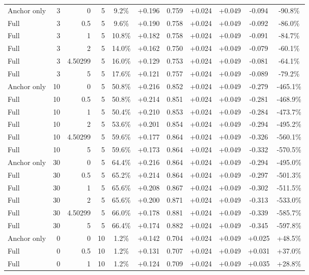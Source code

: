 \begin{table}[htbp]
\begin{tabular}{lrrrccccccc}
Anchor only & 3 & 0 & 5 & 9.2\% & +0.196 & 0.759 & +0.024 & +0.049 & -0.094 & -90.8\% \\
Full & 3 & 0.5 & 5 & 9.6\% & +0.190 & 0.758 & +0.024 & +0.049 & -0.092 & -86.0\% \\
Full & 3 & 1 & 5 & 10.8\% & +0.182 & 0.758 & +0.024 & +0.049 & -0.091 & -84.7\% \\
Full & 3 & 2 & 5 & 14.0\% & +0.162 & 0.750 & +0.024 & +0.049 & -0.079 & -60.1\% \\
Full & 3 & 4.50299 & 5 & 16.0\% & +0.129 & 0.753 & +0.024 & +0.049 & -0.081 & -64.1\% \\
Full & 3 & 5 & 5 & 17.6\% & +0.121 & 0.757 & +0.024 & +0.049 & -0.089 & -79.2\% \\
Anchor only & 10 & 0 & 5 & 50.8\% & +0.216 & 0.852 & +0.024 & +0.049 & -0.279 & -465.1\% \\
Full & 10 & 0.5 & 5 & 50.8\% & +0.214 & 0.851 & +0.024 & +0.049 & -0.281 & -468.9\% \\
Full & 10 & 1 & 5 & 50.4\% & +0.210 & 0.853 & +0.024 & +0.049 & -0.284 & -473.7\% \\
Full & 10 & 2 & 5 & 53.6\% & +0.201 & 0.854 & +0.024 & +0.049 & -0.294 & -495.2\% \\
Full & 10 & 4.50299 & 5 & 59.6\% & +0.177 & 0.864 & +0.024 & +0.049 & -0.326 & -560.1\% \\
Full & 10 & 5 & 5 & 59.6\% & +0.173 & 0.864 & +0.024 & +0.049 & -0.332 & -570.5\% \\
Anchor only & 30 & 0 & 5 & 64.4\% & +0.216 & 0.864 & +0.024 & +0.049 & -0.294 & -495.0\% \\
Full & 30 & 0.5 & 5 & 65.2\% & +0.214 & 0.864 & +0.024 & +0.049 & -0.297 & -501.3\% \\
Full & 30 & 1 & 5 & 65.6\% & +0.208 & 0.867 & +0.024 & +0.049 & -0.302 & -511.5\% \\
Full & 30 & 2 & 5 & 65.6\% & +0.200 & 0.871 & +0.024 & +0.049 & -0.313 & -533.0\% \\
Full & 30 & 4.50299 & 5 & 66.0\% & +0.178 & 0.881 & +0.024 & +0.049 & -0.339 & -585.7\% \\
Full & 30 & 5 & 5 & 66.4\% & +0.174 & 0.882 & +0.024 & +0.049 & -0.345 & -597.8\% \\
Anchor only & 0 & 0 & 10 & 1.2\% & +0.142 & 0.704 & +0.024 & +0.049 & +0.025 & +48.5\% \\
Full & 0 & 0.5 & 10 & 1.2\% & +0.131 & 0.707 & +0.024 & +0.049 & +0.031 & +37.0\% \\
Full & 0 & 1 & 10 & 1.2\% & +0.124 & 0.709 & +0.024 & +0.049 & +0.035 & +28.8\% \\

\end{tabular}
\end{table}
